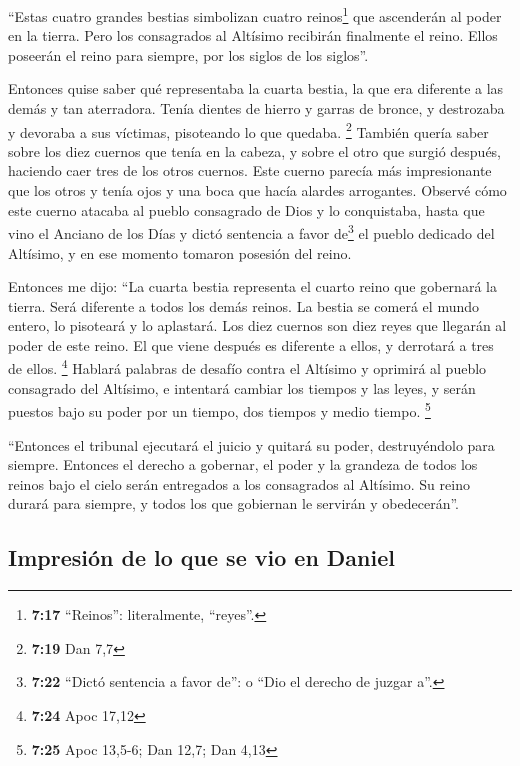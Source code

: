  ``Estas cuatro grandes bestias simbolizan cuatro
reinos\footnote{\textbf{7:17} ``Reinos'': literalmente, ``reyes''.} que
ascenderán al poder en la tierra.  Pero los consagrados
al Altísimo recibirán finalmente el reino. Ellos poseerán el reino para
siempre, por los siglos de los siglos''.

 Entonces quise saber qué representaba la cuarta bestia,
la que era diferente a las demás y tan aterradora. Tenía dientes de
hierro y garras de bronce, y destrozaba y devoraba a sus víctimas,
pisoteando lo que quedaba. \footnote{\textbf{7:19} Dan 7,7}
 También quería saber sobre los diez cuernos que tenía en
la cabeza, y sobre el otro que surgió después, haciendo caer tres de los
otros cuernos. Este cuerno parecía más impresionante que los otros y
tenía ojos y una boca que hacía alardes arrogantes. 
Observé cómo este cuerno atacaba al pueblo consagrado de Dios y lo
conquistaba,  hasta que vino el Anciano de los Días y
dictó sentencia a favor de\footnote{\textbf{7:22} ``Dictó sentencia a
  favor de'': o ``Dio el derecho de juzgar a''.} el pueblo dedicado del
Altísimo, y en ese momento tomaron posesión del reino.

 Entonces me dijo: ``La cuarta bestia representa el
cuarto reino que gobernará la tierra. Será diferente a todos los demás
reinos. La bestia se comerá el mundo entero, lo pisoteará y lo
aplastará.  Los diez cuernos son diez reyes que llegarán
al poder de este reino. El que viene después es diferente a ellos, y
derrotará a tres de ellos. \footnote{\textbf{7:24} Apoc 17,12}
 Hablará palabras de desafío contra el Altísimo y
oprimirá al pueblo consagrado del Altísimo, e intentará cambiar los
tiempos y las leyes, y serán puestos bajo su poder por un tiempo, dos
tiempos y medio tiempo. \footnote{\textbf{7:25} Apoc 13,5-6; Dan 12,7;
  Dan 4,13}

 ``Entonces el tribunal ejecutará el juicio y quitará su
poder, destruyéndolo para siempre.  Entonces el derecho a
gobernar, el poder y la grandeza de todos los reinos bajo el cielo serán
entregados a los consagrados al Altísimo. Su reino durará para siempre,
y todos los que gobiernan le servirán y obedecerán''.

\hypertarget{impresiuxf3n-de-lo-que-se-vio-en-daniel}{%
\subsection{Impresión de lo que se vio en
Daniel}\label{impresiuxf3n-de-lo-que-se-vio-en-daniel}}

